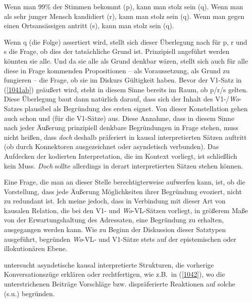 \begin{exe}
	\ex\label{1041} 
		\begin{xlist}	
			\ex\label{1041a} Wenn man 99\% der Stimmen bekommt (p), kann man stolz sein (q).
			\ex\label{1041b} Wenn man als sehr junger Mensch kandidiert (r), kann man stolz sein (q).
			\ex\label{1041c} Wenn man gegen einen Ortsansässigen antritt (s), kann man stolz sein (q).
		\end{xlist}
\end{exe}
Wenn q (die Folge) assertiert wird, stellt sich dieser Überlegung nach für p, r und s die Frage, ob dies der tatsächliche Grund ist. Prinzipiell angeführt werden könnten sie alle. Und da sie alle als Grund denkbar wären, stellt sich auch für alle diese in Frage kommenden Propositionen – als Voraussetzung, als Grund zu fungieren – die Frage, ob sie im Diskurs Gültigkeit haben. Bevor der V1-Satz in (\ref{1041ab}) geäußert wird, steht in diesem Sinne bereits im Raum, ob p/r/s gelten. Diese Überlegung baut dann natürlich darauf, dass sich der Inhalt des V1-/\textit{Wo}-Satzes plausibel als Begründung des ersten eignet. Von dieser Konstellation gehen auch schon \citet{Oennerfors1997} und \citet{Pittner2011} (für die V1-Sätze) aus. Diese Annahme, dass in diesem Sinne nach jeder Äußerung prinzipiell denkbare Begründungen in Frage stehen, muss nicht heißen, dass \textit{doch} deshalb präferiert in kausal interpretierten Sätzen auftritt (ob durch Konnektoren ausgezeichnet oder asyndetisch  verbunden). Das Aufdecken der kodierten Interpretation, die im Kontext vorliegt, ist schließlich kein Muss. \textit{Doch} sollte allerdings in derart interpretierten Sätzen stehen können. 

Eine Frage, die man an dieser Stelle berechtigterweise aufwerfen kann, ist, ob die Vorstellung, dass jede Äußerung Möglichkeiten ihrer Begründung evoziert, nicht zu redundant ist. Ich meine jedoch, dass in Verbindung mit dieser Art von kausalen Relation, die bei den V1- und \textit{Wo}-VL-Sätzen vorliegt, in größerem Maße von der Erwartungshaltung des Adressaten, eine Begründung zu erhalten, ausgegangen werden kann. Wie zu Beginn der Diskussion dieser Satztypen ausgeführt, begründen \textit{Wo}-VL- und V1-Sätze stets auf  der epistemischen oder  illokutionären Ebene. 

\citet{Gohl2000} untersucht asyndetische kausal interpretierte Strukturen, die vor\-herige Konversationszüge erklären oder rechtfertigen, wie z.B.\ in (\ref{1042}), wo die unterstrichenen Beiträge Vorschläge bzw. dispräferierte Reaktionen auf solche (s.u.) begründen.
		
